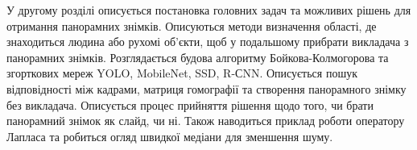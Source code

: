 У другому розділі описується постановка головних
задач та можливих рішень для отримання панорамних знімків.
Описуються методи визначення області,
де знаходиться людина або рухомі об'єкти,
щоб у подальшому прибрати викладача з панорамних знімків.
Розглядається будова алгоритму Бойкова-Колмогорова та згорткових мереж
YOLO, MobileNet, SSD, R-СNN. Описується пошук відповідності між кадрами,
матриця гомографії та створення панорамного
знімку без викладача.
Описується процес прийняття рішення щодо того,
чи брати панорамний знімок як слайд, чи ні.
Також наводиться приклад роботи оператору Лапласа та робиться огляд швидкої медіани для
зменшення шуму.